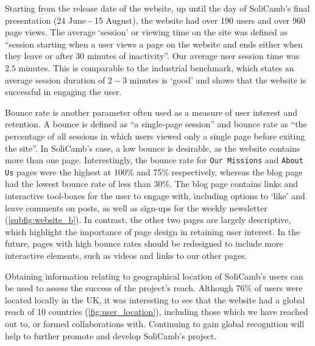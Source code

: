         
        
Starting from the release date of the website, up until the day of SoliCamb's final presentation (24 June - 15 August), the website had over 190 users and over 960 page views. The average `session' or viewing time on the site was defined as \enquote{session starting when a user views a page on the website and ends either when they leave or after 30 minutes of inactivity}. Our average user session time was $2.5$ minutes. This is comparable to the industrial benchmark, which states an average session duration of $2-3$ minutes is `good' \cite{user_session_stats, user_session_stats1} and shows that the  website is successful in engaging the user.
        
    Bounce rate is another parameter often used as a measure of user interest and retention. A bounce is defined as \enquote{a single-page session} and bounce rate as  \enquote{the percentage of all sessions in which users viewed only a single page before exiting the site}. In SoliCamb's case, a low bounce is desirable, as the website contains more than one page. Interestingly, the bounce rate for \texttt{Our Missions} and \texttt{About Us} pages were the highest at 100\% and 75\% respectively, whereas the blog page had the lowest bounce rate of less than 30\%. The blog page contains links and interactive tool-boxes for the user to engage with, including options to `like' and leave comments on posts, as well as sign-ups for the weekly newsletter (\cref{subfig:website_b}). In contrast, the other two pages are largely descriptive, which highlight the importance of page design in retaining user interest. In the future, pages with high bounce rates should be redesigned to include more interactive elements, such as videos and links to our other pages.
    
    Obtaining information relating to geographical location of SoliCamb's users can be used to assess the success of the project's reach. Although 76\% of users were located locally in the UK, it was interesting to see that the website had a global reach of 10 countries (\cref{fig:user_location}), including those which we have reached out to, or formed collaborations with. Continuing to gain global recognition will help to further promote and develop SoliCamb's project. 
        
